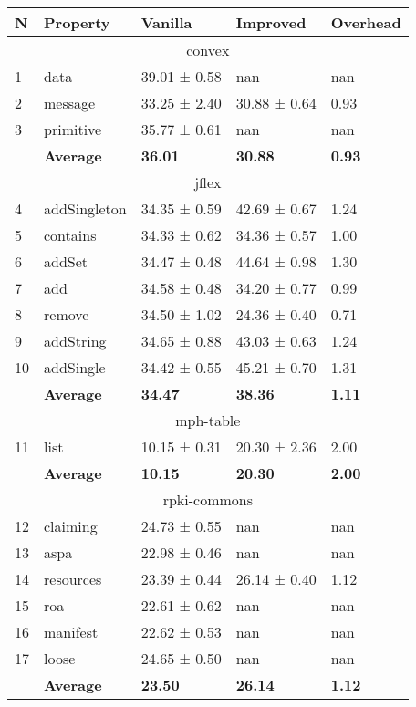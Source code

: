 \begin{tabular}{lllll}
N & Property & Vanilla & Improved & Overhead \\
\hline
\multicolumn{5}{c}{convex} \\
\hline
1 & data & 39.01 ± 0.58 & nan & nan \\
2 & message & 33.25 ± 2.40 & 30.88 ± 0.64 & 0.93 \\
3 & primitive & 35.77 ± 0.61 & nan & nan \\
\textbf{} & \textbf{Average} & \textbf{36.01} & \textbf{30.88} & \textbf{0.93} \\
\hline
\multicolumn{5}{c}{jflex} \\
\hline
4 & addSingleton & 34.35 ± 0.59 & 42.69 ± 0.67 & 1.24 \\
5 & contains & 34.33 ± 0.62 & 34.36 ± 0.57 & 1.00 \\
6 & addSet & 34.47 ± 0.48 & 44.64 ± 0.98 & 1.30 \\
7 & add & 34.58 ± 0.48 & 34.20 ± 0.77 & 0.99 \\
8 & remove & 34.50 ± 1.02 & 24.36 ± 0.40 & 0.71 \\
9 & addString & 34.65 ± 0.88 & 43.03 ± 0.63 & 1.24 \\
10 & addSingle & 34.42 ± 0.55 & 45.21 ± 0.70 & 1.31 \\
\textbf{} & \textbf{Average} & \textbf{34.47} & \textbf{38.36} & \textbf{1.11} \\
\hline
\multicolumn{5}{c}{mph-table} \\
\hline
11 & list & 10.15 ± 0.31 & 20.30 ± 2.36 & 2.00 \\
\textbf{} & \textbf{Average} & \textbf{10.15} & \textbf{20.30} & \textbf{2.00} \\
\hline
\multicolumn{5}{c}{rpki-commons} \\
\hline
12 & claiming & 24.73 ± 0.55 & nan & nan \\
13 & aspa & 22.98 ± 0.46 & nan & nan \\
14 & resources & 23.39 ± 0.44 & 26.14 ± 0.40 & 1.12 \\
15 & roa & 22.61 ± 0.62 & nan & nan \\
16 & manifest & 22.62 ± 0.53 & nan & nan \\
17 & loose & 24.65 ± 0.50 & nan & nan \\
\textbf{} & \textbf{Average} & \textbf{23.50} & \textbf{26.14} & \textbf{1.12} \\
\end{tabular}
